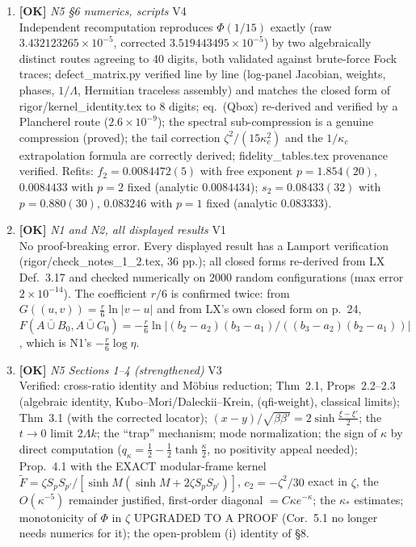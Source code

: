 \documentclass[11pt]{article}
\begin{document}
\begin{enumerate}[leftmargin=1.6em,itemsep=6pt]
\item \textbf{[OK]} \emph{N5 \S6 numerics, scripts} \hfill\textsc{V4}\\ Independent recomputation reproduces \(\Phi(1/15)\) exactly (raw \(3.432123265\times10^{-5}\), corrected \(3.519443495\times10^{-5}\)) by two algebraically distinct routes agreeing to 40 digits, both validated against brute-force Fock traces; defect\_matrix.py verified line by line (log-panel Jacobian, weights, phases, \(1/\Lambda\), Hermitian traceless assembly) and matches the closed form of rigor/kernel\_identity.tex to 8 digits; eq.\ (Qbox) re-derived and verified by a Plancherel route (\(2.6\times10^{-9}\)); the spectral sub-compression is a genuine compression (proved); the tail correction \(\zeta^2/(15\kappa_c^2)\) and the \(1/\kappa_c\) extrapolation formula are correctly derived; fidelity\_tables.tex provenance verified. Refits: \(f_2=0.0084472(5)\) with free exponent \(p=1.854(20)\), \(0.0084433\) with \(p=2\) fixed (analytic \(0.0084434\)); \(s_2=0.08433(32)\) with \(p=0.880(30)\), \(0.083246\) with \(p=1\) fixed (analytic \(0.083333\)).
\item \textbf{[OK]} \emph{N1 and N2, all displayed results} \hfill\textsc{V1}\\ No proof-breaking error. Every displayed result has a Lamport verification (rigor/check\_notes\_1\_2.tex, 36 pp.); all closed forms re-derived from LX Def.~3.17 and checked numerically on 2000 random configurations (max error \(2\times10^{-14}\)). The coefficient \(r/6\) is confirmed twice: from \(G((u,v))=\frac r6\ln|v-u|\) and from LX's own closed form on p.~24, \(F(A\bar\cup B_0,A\bar\cup C_0)=-\frac r6\ln|(b_2-a_2)(b_3-a_1)/((b_3-a_2)(b_2-a_1))|\), which is N1's \(-\frac r6\log\eta\).
\item \textbf{[OK]} \emph{N5 Sections 1--4 (strengthened)} \hfill\textsc{V3}\\ Verified: cross-ratio identity and M\"obius reduction; Thm~2.1, Props~2.2--2.3 (algebraic identity, Kubo--Mori/Daleckii--Krein, (qfi-weight), classical limits); Thm~3.1 (with the corrected locator); \((x-y)/\sqrt{\beta\beta'}=2\sinh\frac{\xi-\xi'}2\); the \(t\to0\) limit \(2\Lambda k\); the ``trap'' mechanism; mode normalization; the sign of \(\kappa\) by direct computation (\(q_\kappa=\frac12-\frac12\tanh\frac\kappa2\), no positivity appeal needed); Prop.~4.1 with the EXACT modular-frame kernel \(\widetilde F=\zeta S_pS_{p'}/[\sinh M(\sinh M+2\zeta S_pS_{p'})]\), \(c_2=-\zeta^2/30\) exact in \(\zeta\), the \(O(\kappa^{-5})\) remainder justified, first-order diagonal \(=C\kappa e^{-\kappa}\); the \(\kappa_*\) estimates; monotonicity of \(\Phi\) in \(\zeta\) UPGRADED TO A PROOF (Cor.~5.1 no longer needs numerics for it); the open-problem (i) identity of \S8.

\end{enumerate}
\end{document}
